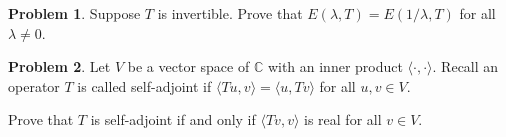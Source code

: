 \documentclass[12pt]{article}
\theoremstyle{definition}
\newtheorem{problem}{Problem}
\begin{document}
\begin{problem}
    Suppose $T$ is invertible. Prove that $E(\lambda,T) = E(1/\lambda,T)$ for all $\lambda\neq 0$.
\end{problem}

\begin{problem}
    Let $V$ be a vector space of $\mathbb{C}$ with an inner product $\langle \cdot, \cdot\rangle$.
    Recall an operator $T$ is called self-adjoint if $\langle Tu,v\rangle = {\langle u,Tv\rangle}$ for all $u,v\in V$.

    Prove that $T$ is self-adjoint if and only if $\langle Tv,v\rangle$ is real for all $v\in V$.
\end{problem}
\end{document}
